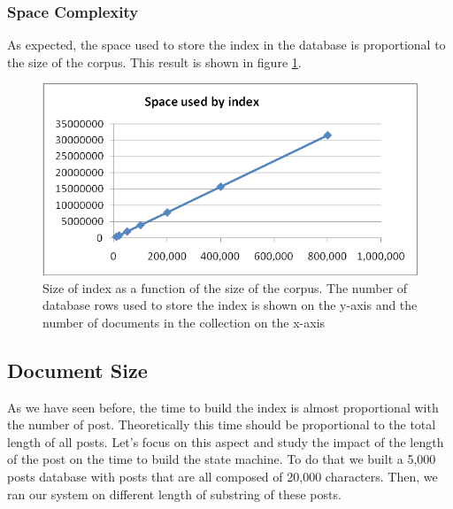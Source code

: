 \documentclass[10pt]{report}
\begin{document}
\subsubsection{Space Complexity}
As expected, the space used to store the index in the database is
proportional to the size of the corpus. This result is shown in figure
\ref{fig:corpsizespacecomplexbuildindex}.

\begin{figure}[h!]
  \begin{center}
    \includegraphics[width=\textwidth,height=!]{corpsizespacecomplexbuildindex}
  \end{center}
    \caption{Size of index as a function of the size of the
      corpus. The number of database rows used to store the index is
      shown on the y-axis and the number of documents in the
      collection on the x-axis} 
    \label{fig:corpsizespacecomplexbuildindex}
\end{figure}


\subsection{Document Size} 
As we have seen before, the time to build the index is almost
proportional with the number of post. Theoretically this time should
be proportional to the total length of all posts. Let’s focus on this
aspect and study the impact of the length of the post on the time to
build the state machine. To do that we built a 5,000 posts database
with posts that are all composed of 20,000 characters. Then, we ran
our system on different length of substring of these posts.  
\end{document}
